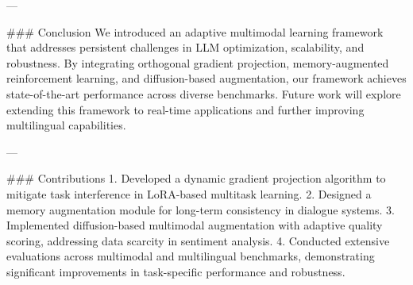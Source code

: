 ---

### Conclusion  
We introduced an adaptive multimodal learning framework that addresses persistent challenges in LLM optimization, scalability, and robustness. By integrating orthogonal gradient projection, memory-augmented reinforcement learning, and diffusion-based augmentation, our framework achieves state-of-the-art performance across diverse benchmarks. Future work will explore extending this framework to real-time applications and further improving multilingual capabilities.

---

### Contributions  
1. Developed a dynamic gradient projection algorithm to mitigate task interference in LoRA-based multitask learning.  
2. Designed a memory augmentation module for long-term consistency in dialogue systems.  
3. Implemented diffusion-based multimodal augmentation with adaptive quality scoring, addressing data scarcity in sentiment analysis.  
4. Conducted extensive evaluations across multimodal and multilingual benchmarks, demonstrating significant improvements in task-specific performance and robustness.  